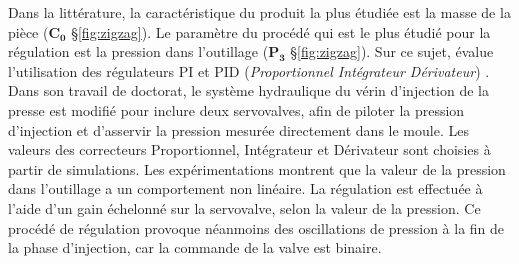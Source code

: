 Dans la littérature, la caractéristique du produit la plus étudiée est la masse de la pièce ($\boldsymbol{C_0}$ §\ref{fig:zigzag}).
Le paramètre du procédé qui est le plus étudié pour la régulation est la pression dans l'outillage \cite{fara_evaluation_1985, kamal_dynamics_1987} ($\boldsymbol{P_3}$ §\ref{fig:zigzag}).
Sur ce sujet, \citeauthor{fara_control_1988} évalue l'utilisation des régulateurs PI et PID (\textit{Proportionnel Intégrateur Dérivateur}) \cite{fara_control_1988}.
Dans son travail de doctorat, le système hydraulique du vérin d’injection de la presse est modifié pour inclure deux servovalves, afin de piloter la pression d’injection et d’asservir la pression mesurée directement dans le moule.
Les valeurs des correcteurs Proportionnel, Intégrateur et Dérivateur sont choisies à partir de simulations.
Les expérimentations montrent que la valeur de la pression dans l'outillage a un comportement non linéaire.
La régulation est effectuée à l'aide d'un gain échelonné sur la servovalve, selon la valeur de la pression.
Ce procédé de régulation provoque néanmoins des oscillations de pression à la fin de la phase d'injection, car la commande de la valve est binaire.

